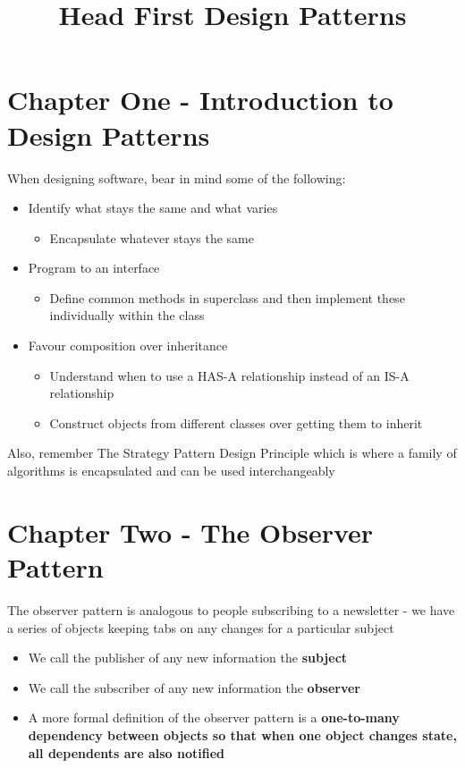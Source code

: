 \documentclass{report}
\title{Head First Design Patterns}
\date{}
\begin{document}
\maketitle

\section*{Chapter One - Introduction to Design Patterns}

When designing software, bear in mind some of the following:

\begin{itemize}
  \item Identify what stays the same and what varies
  \begin{itemize}
    \item{Encapsulate whatever stays the same}
  \end{itemize}
  \item Program to an interface
  \begin{itemize}
    \item{Define common methods in superclass and then implement these individually within the class}
  \end{itemize}
  \item Favour composition over inheritance
  \begin{itemize}
    \item Understand when to use a HAS-A relationship instead of an IS-A relationship
    \item Construct objects from different classes over getting them to inherit
  \end{itemize}
\end{itemize}
Also, remember The Strategy Pattern Design Principle which is where a family of algorithms is encapsulated and can be used interchangeably

\section*{Chapter Two - The Observer Pattern}

The observer pattern is analogous to people subscribing to a newsletter - we have a series of objects keeping tabs on any changes for a particular subject

\begin{itemize}
  \item We call the publisher of any new information the \textbf{subject}
  \item We call the subscriber of any new information the \textbf{observer}
  \item A more formal definition of the observer pattern is a \textbf{one-to-many dependency between objects so that when one object changes state, all dependents are also notified}
\end{itemize}
\end{document}
